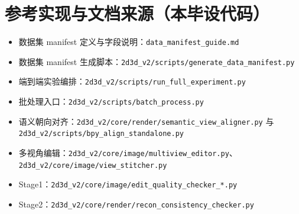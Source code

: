 \documentclass[UTF8,a4paper,11pt]{ctexart}
\begin{document}
\section*{参考实现与文档来源（本毕设代码）}
\begin{itemize}
  \item 数据集 manifest 定义与字段说明：\texttt{data\_manifest\_guide.md}
  \item 数据集 manifest 生成脚本：\texttt{2d3d\_v2/scripts/generate\_data\_manifest.py}
  \item 端到端实验编排：\texttt{2d3d\_v2/scripts/run\_full\_experiment.py}
  \item 批处理入口：\texttt{2d3d\_v2/scripts/batch\_process.py}
  \item 语义朝向对齐：\texttt{2d3d\_v2/core/render/semantic\_view\_aligner.py} 与 \texttt{2d3d\_v2/scripts/bpy\_align\_standalone.py}
  \item 多视角编辑：\texttt{2d3d\_v2/core/image/multiview\_editor.py}、\texttt{2d3d\_v2/core/image/view\_stitcher.py}
  \item Stage1：\texttt{2d3d\_v2/core/image/edit\_quality\_checker\_*.py}
  \item Stage2：\texttt{2d3d\_v2/core/render/recon\_consistency\_checker.py}
\end{itemize}
\end{document}
